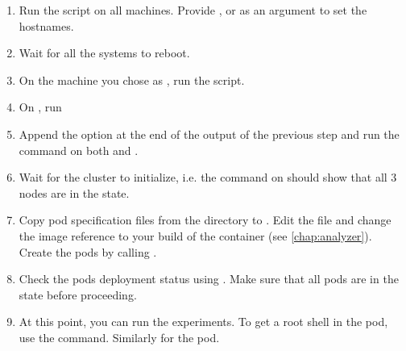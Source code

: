 \begin{enumerate}
    \item Run the  script on all machines. Provide ,  or  as an argument to set the hostnames.

    \item Wait for all the systems to reboot.

    \item On the machine you chose as , run the  script.

    \item On , run 

    \item Append the  option at the end of the output of the previous step and run the command on both  and .

    \item Wait for the cluster to initialize, i.e. the command  on  should show that all 3 nodes are in the  state.

    \item Copy pod specification files from the  directory to . Edit the  file and change the image reference to your build of the  container (see \cref{chap:analyzer}). Create the pods by calling .

    \item Check the pods deployment status using . Make sure that all pods are in the  state before proceeding.

    \item At this point, you can run the experiments. To get a root shell in the  pod, use the  command. Similarly for the  pod.
\end{enumerate}